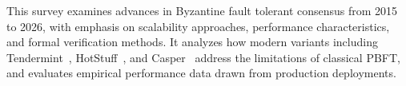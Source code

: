 This survey examines advances in Byzantine fault tolerant consensus from 2015 to 2026, with emphasis on scalability approaches, performance characteristics, and formal verification methods. It analyzes how modern variants including Tendermint~\cite{buchman2016tendermint}, HotStuff~\cite{yin2019hotstuff}, and Casper~\cite{buterin2020combining} address the limitations of classical PBFT, and evaluates empirical performance data drawn from production deployments.